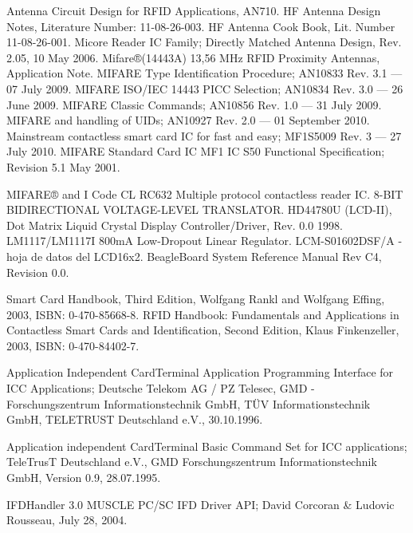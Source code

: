 \begin{thebibliography}{200}

 Antenna Circuit Design for RFID Applications, AN710.
 HF Antenna Design Notes, Literature Number: 11-08-26-003.
 HF Antenna Cook Book, Lit. Number 11-08-26-001.
 Micore Reader IC Family; Directly Matched Antenna Design, Rev. 2.05, 10 May 2006.
 Mifare®(14443A) 13,56 MHz RFID Proximity Antennas, Application Note.
\bibitem{} MIFARE Type Identification Procedure; AN10833 Rev. 3.1 — 07 July 2009.
\bibitem{} MIFARE ISO/IEC 14443 PICC Selection; AN10834 Rev. 3.0 — 26 June 2009.
\bibitem{} MIFARE Classic Commands; AN10856 Rev. 1.0 — 31 July 2009.
\bibitem{} MIFARE and handling of UIDs; AN10927 Rev. 2.0 — 01 September 2010.
\bibitem{} Mainstream contactless smart card IC for fast and easy; MF1S5009 Rev. 3 — 27 July 2010.
\bibitem{} MIFARE Standard Card IC MF1 IC S50 Functional Specification; Revision 5.1 May 2001.

 MIFARE® and I Code CL RC632 Multiple protocol contactless reader IC.
 8-BIT BIDIRECTIONAL VOLTAGE-LEVEL TRANSLATOR.
 HD44780U (LCD-II), Dot Matrix Liquid Crystal Display Controller/Driver, Rev. 0.0 1998. 
 LM1117/LM1117I 800mA Low-Dropout Linear Regulator.
 LCM-S01602DSF/A - hoja de datos del LCD16x2.
 BeagleBoard System Reference Manual Rev C4, Revision 0.0.

 Smart Card Handbook, Third Edition, Wolfgang Rankl and Wolfgang Effing, 2003, ISBN: 0-470-85668-8. 
 RFID Handbook: Fundamentals and Applications in Contactless Smart Cards and Identification,
Second Edition, Klaus Finkenzeller, 2003, ISBN: 0-470-84402-7. 

 Application Independent CardTerminal Application Programming Interface for ICC Applications; 
Deutsche Telekom AG / PZ Telesec, GMD - Forschungszentrum Informationstechnik GmbH, TÜV Informationstechnik GmbH, TELETRUST Deutschland e.V., 30.10.1996.

 Application independent CardTerminal Basic Command Set for ICC applications; 
TeleTrusT Deutschland e.V., GMD Forschungszentrum Informationstechnik GmbH, Version 0.9, 28.07.1995.

 IFDHandler 3.0 MUSCLE PC/SC IFD Driver API; David Corcoran \& Ludovic Rousseau, July 28, 2004.


\end{thebibliography}
